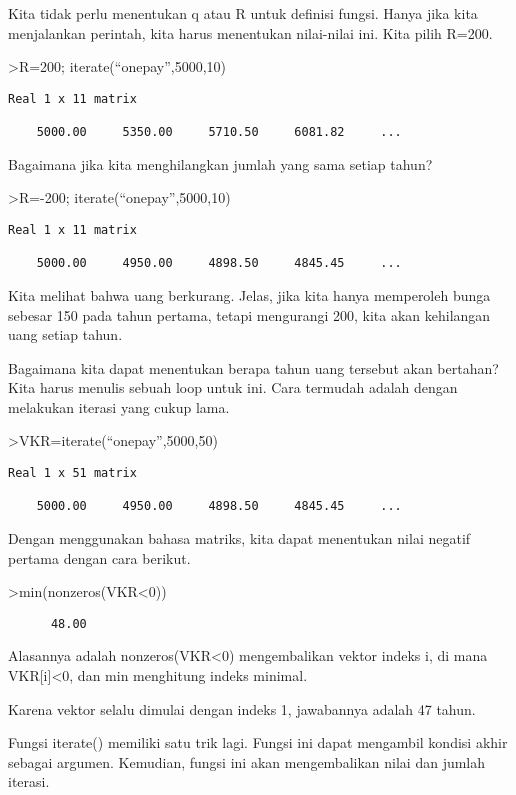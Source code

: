\documentclass[
]{book}
\begin{document}
Kita tidak perlu menentukan q atau R untuk definisi fungsi. Hanya jika kita menjalankan perintah, kita harus menentukan nilai-nilai ini. Kita pilih R=200.

\textgreater R=200; iterate(``onepay'',5000,10)

\begin{verbatim}
Real 1 x 11 matrix

    5000.00     5350.00     5710.50     6081.82     ...
\end{verbatim}

Bagaimana jika kita menghilangkan jumlah yang sama setiap tahun?

\textgreater R=-200; iterate(``onepay'',5000,10)

\begin{verbatim}
Real 1 x 11 matrix

    5000.00     4950.00     4898.50     4845.45     ...
\end{verbatim}

Kita melihat bahwa uang berkurang. Jelas, jika kita hanya memperoleh bunga sebesar 150 pada tahun pertama, tetapi mengurangi 200, kita akan kehilangan uang setiap tahun.

Bagaimana kita dapat menentukan berapa tahun uang tersebut akan bertahan? Kita harus menulis sebuah loop untuk ini. Cara termudah adalah dengan melakukan iterasi yang cukup lama.

\textgreater VKR=iterate(``onepay'',5000,50)

\begin{verbatim}
Real 1 x 51 matrix

    5000.00     4950.00     4898.50     4845.45     ...
\end{verbatim}

Dengan menggunakan bahasa matriks, kita dapat menentukan nilai negatif pertama dengan cara berikut.

\textgreater min(nonzeros(VKR\textless0))

\begin{verbatim}
      48.00 
\end{verbatim}

Alasannya adalah nonzeros(VKR\textless0) mengembalikan vektor indeks i, di mana VKR{[}i{]}\textless0, dan min menghitung indeks minimal.

Karena vektor selalu dimulai dengan indeks 1, jawabannya adalah 47 tahun.

Fungsi iterate() memiliki satu trik lagi. Fungsi ini dapat mengambil kondisi akhir sebagai argumen. Kemudian, fungsi ini akan mengembalikan nilai dan jumlah iterasi.
\end{document}
